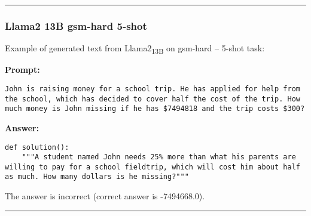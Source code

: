 	\noindent\rule{\textwidth}{0.4pt}

	\subsubsection*{Llama2 13B gsm-hard 5-shot}
	\noindent Example of generated text from Llama2\textsubscript{13B} on gsm-hard -- 5-shot task:
	\begin{displayquote}
		\textbf{Prompt:}
		\begin{Verbatim}[fontsize=\small,breaklines]
John is raising money for a school trip. He has applied for help from the school, which has decided to cover half the cost of the trip. How much money is John missing if he has $7494818 and the trip costs $300?
	\end{Verbatim}
		\textbf{Answer:}
		\begin{Verbatim}[fontsize=\small,breaklines]
def solution():
    """A student named John needs 25% more than what his parents are willing to pay for a school fieldtrip, which will cost him about half as much. How many dollars is he missing?"""
	\end{Verbatim}
	\end{displayquote}
	The answer is incorrect (correct answer is -7494668.0).

	\noindent\rule{\textwidth}{0.4pt}

